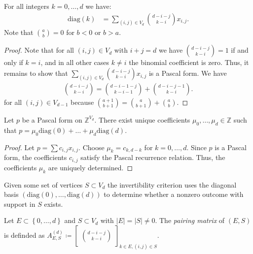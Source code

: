 \begin{proposition}
    For all integers \( k = 0, \dots, d \) we have:
    \begin{align*}
        \mathrm{diag}(k)  &= \sum_{(i,j) \in V_d}\binom{d - i - j}{k-i} x_{i,j}.
    \end{align*} 
    Note that \( \binom{a}{b} = 0 \) for \( b < 0 \) or \( b > a \).
\end{proposition}

\begin{proof}
    Note that for all \( (i,j) \in V_d \) with \( i+j = d \) we have \( \binom{d - i - j}{k-i} = 1 \) if and only if \( k= i \), and in all other cases \( k \neq i \) the binomial coefficient is zero. Thus, it remains to show that \( \sum_{(i,j) \in V_d}\binom{d - i - j}{k-i} x_{i,j} \) is a Pascal form. We have 
    \begin{align*}
        \binom{d-i-j}{k-i} = \binom{d-i-1-j}{k-i-1} + \binom{d-i-j-1}{k-i}.
    \end{align*}
    for all \( (i,j) \in V_{d-1} \) because \( \binom{a+1}{b+1} = \binom{a}{b+1} + \binom{a}{b}\).
\end{proof}

\begin{proposition}
    Let \( p \) be a Pascal form on \( \mathbb Z^{V_d} \). There exist unique coefficients \( \mu_0, \dots, \mu_d \in \mathbb{Z} \) such that 
    \( p = \mu_0 \mathrm{diag}(0) + \dots + \mu_d \mathrm{diag}(d) \).
\end{proposition}

\begin{proof}
    Let \( p = \sum c_{i,j}x_{i,j} \). Choose \( \mu_k = c_{k,d-k} \) for \( k=0, \dots, d \). Since \( p \) is a Pascal form, the coefficients \( c_{i,j} \) satisfy the Pascal recurrence relation. Thus, the coefficients \( \mu_k \) are uniquely determined.
\end{proof}

Given some set of vertices \( S \subset V_d \) the invertibility criterion uses the diagonal basis \( (\mathrm{diag}(0), \dots, \mathrm{diag}(d)) \) to determine whether a nonzero outcome with support in \( S \) exists.

\begin{definition}
    Let \( E \subset \left\{ 0, \dots, d \right\} \) and \( S \subset V_d \) with \( \lvert E \rvert = \lvert S \rvert \neq 0 \). The \emph{pairing matrix} of \( (E,S) \) is definded as \( A^{(d)}_{E,S} \coloneqq \begin{bmatrix} \binom{d-i-j}{k-i} \end{bmatrix}_{k \in E, (i,j) \in S} \).
\end{definition}

